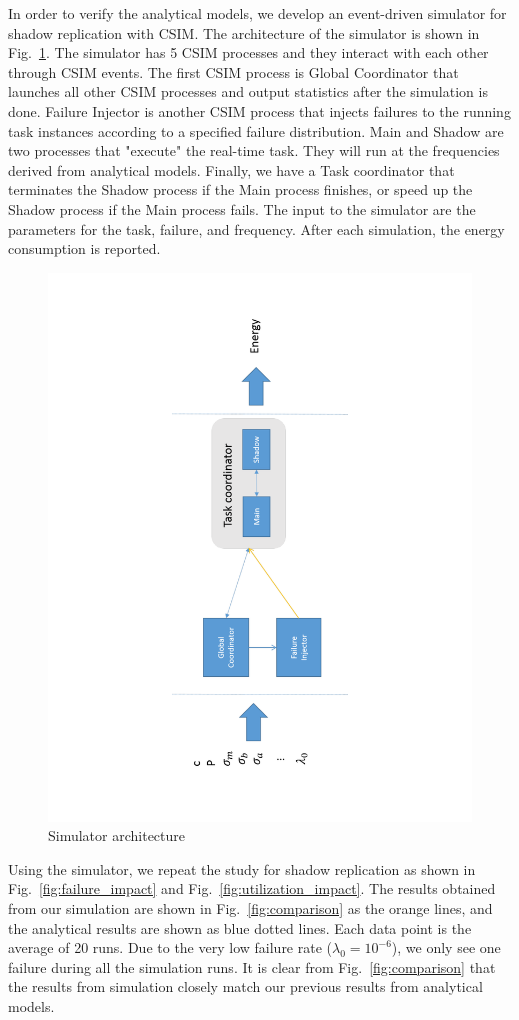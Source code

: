 In order to verify the analytical models, we develop an event-driven simulator for shadow replication with CSIM. 
The architecture of the simulator is shown in Fig.~\ref{fig:sim}. The simulator has 5 CSIM processes and they interact
with each other through CSIM events. The first CSIM process is Global Coordinator that launches all other CSIM processes
and output statistics after the simulation is done. Failure Injector is another CSIM process that injects failures to 
the running task instances according to a specified failure distribution. Main and Shadow are two processes that "execute" 
the real-time task. They will run at the frequencies derived from analytical models. Finally, we have a Task coordinator
 that terminates the Shadow process if the Main process finishes, or speed up the Shadow process if the Main process 
fails. 
The input to the simulator are the parameters for the task, failure, and frequency. After each simulation, the energy 
consumption is reported. 


\begin{figure}[!t]
	\begin{center}
    	\includegraphics[width=0.5\columnwidth]{Figures/simulator}
	\end{center}
	\caption{Simulator architecture}
	\label{fig:sim}
\end{figure}

Using the simulator, we repeat the study for shadow replication as shown in Fig.~\ref{fig:failure_impact}  and Fig.~\ref{fig:utilization_impact}. 
The results obtained from our simulation are shown in Fig.~\ref{fig:comparison} as the orange lines, and the analytical results are shown as blue dotted lines. 
Each data point is the average of 20 runs. Due to the very low failure rate ($\lambda_0=10^{-6}$), we only see one failure during all the simulation runs. It is clear from Fig.~\ref{fig:comparison} that the results from simulation closely match our previous results from analytical models.

